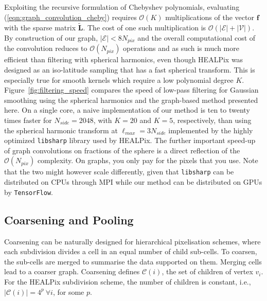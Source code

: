 \documentclass[final,twocolumn,3p,times,sort&compress]{elsarticle}
\newcommand{\figref}[1]{Figure~\ref{fig:#1}}
\newcommand{\eqnref}[1]{(\ref{eqn:#1})}
\renewcommand{\b}[1]{{\bm{#1}}}   %
\newcommand{\1}{\b{1}}              %
\newcommand{\0}{\b{0}}              %
\newcommand{\V}{\mathcal{V}}
\newcommand{\E}{\mathcal{E}}
\newcommand{\C}{\mathcal{C}}
\renewcommand{\L}{\b{L}}
\newcommand{\tL}{\tilde{\L}}
\newcommand{\f}{\b{f}}
\newcommand{\bO}{\mathcal{O}}
\newcommand{\pkg}[1]{\texttt{#1}}
\begin{document}
Exploiting the recursive formulation of Chebyshev polynomials, evaluating \eqnref{graph_convolution_cheby} requires $\bO(K)$ multiplications of the vector $\f$ with the sparse matrix $\tL$.
The cost of one such multiplication is $\bO(|\E| + |\V|)$.
By construction of our graph, $|\E| < 8 N_{pix}$ and the overall computational cost of the convolution reduces to $\bO(N_{pix})$ operations and as such is much more efficient than filtering with spherical harmonics, even though HEALPix was designed as an iso-latitude sampling that has a fast spherical transform.
This is especially true for smooth kernels which require a low polynomial degree $K$.
\figref{filtering_speed} compares the speed of low-pass filtering for Gaussian smoothing using the spherical harmonics and the graph-based method presented here.
On a single core, a naive implementation of our method is ten to twenty times faster for $N_{side} = 2048$, with $K=20$ and $K=5$, respectively, than using the spherical harmonic transform at $\ell_{max} = 3 N_{side}$ implemented by the highly optimized \pkg{libsharp} \citep{reinecke2013libsharp} library used by HEALPix.
The further important speed-up of graph convolutions on fractions of the sphere is a direct reflection of the $\bO(N_{pix})$ complexity.
On graphs, you only pay for the pixels that you use.
Note that the two might however scale differently, given that \pkg{libsharp} can be distributed on CPUs through MPI while our method can be distributed on GPUs by \pkg{TensorFlow}.

\subsection{Coarsening and Pooling}

Coarsening can be naturally designed for hierarchical pixelisation schemes, where each subdivision divides a cell in an equal number of child sub-cells.
To coarsen, the sub-cells are merged to summarise the data supported on them.
Merging cells lead to a coarser graph.
Coarsening defines $\C(i)$, the set of children of vertex $v_i$.
For the HEALPix subdivision scheme, the number of children is constant, i.e., $| \C(i) | = 4^p \ \forall i$, for some $p$.
\end{document}
